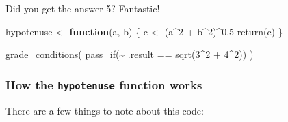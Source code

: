 \documentclass[
]{article}
\newenvironment{Shaded}{\begin{snugshade}}{\end{snugshade}}
\newcommand{\ControlFlowTok}[1]{\textcolor[rgb]{0.13,0.29,0.53}{\textbf{#1}}}
\newcommand{\DecValTok}[1]{\textcolor[rgb]{0.00,0.00,0.81}{#1}}
\newcommand{\FloatTok}[1]{\textcolor[rgb]{0.00,0.00,0.81}{#1}}
\newcommand{\FunctionTok}[1]{\textcolor[rgb]{0.00,0.00,0.00}{#1}}
\newcommand{\NormalTok}[1]{#1}
\newcommand{\OtherTok}[1]{\textcolor[rgb]{0.56,0.35,0.01}{#1}}
\newcommand{\SpecialCharTok}[1]{\textcolor[rgb]{0.00,0.00,0.00}{#1}}
\theoremstyle{definition}
\theoremstyle{definition}
\theoremstyle{definition}
\theoremstyle{definition}
\theoremstyle{remark}
\begin{document}
Did you get the answer 5? Fantastic!

\begin{Shaded}
\begin{Highlighting}[]
\NormalTok{hypotenuse }\OtherTok{\textless{}{-}} \ControlFlowTok{function}\NormalTok{(a, b) \{}
\NormalTok{  c }\OtherTok{\textless{}{-}}\NormalTok{ (a}\SpecialCharTok{\^{}}\DecValTok{2} \SpecialCharTok{+}\NormalTok{ b}\SpecialCharTok{\^{}}\DecValTok{2}\NormalTok{)}\SpecialCharTok{\^{}}\FloatTok{0.5}
  \FunctionTok{return}\NormalTok{(c)}
\NormalTok{\}}
\end{Highlighting}
\end{Shaded}

\begin{Shaded}
\begin{Highlighting}[]
\FunctionTok{grade\_conditions}\NormalTok{(}
  \FunctionTok{pass\_if}\NormalTok{(}\SpecialCharTok{\textasciitilde{}}\NormalTok{ .result }\SpecialCharTok{==} \FunctionTok{sqrt}\NormalTok{(}\DecValTok{3}\SpecialCharTok{\^{}}\DecValTok{2} \SpecialCharTok{+} \DecValTok{4}\SpecialCharTok{\^{}}\DecValTok{2}\NormalTok{))}
\NormalTok{)}
\end{Highlighting}
\end{Shaded}

\hypertarget{how-the-hypotenuse-function-works}{%
\subsubsection{\texorpdfstring{How the \texttt{hypotenuse} function works}{How the hypotenuse function works}}\label{how-the-hypotenuse-function-works}}

There are a few things to note about this code:
\end{document}
